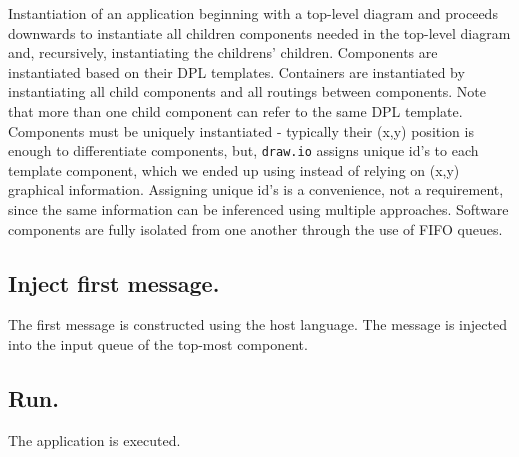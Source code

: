 \documentclass[10pt,anonymous,review]{acmart}
\begin{document}
  Instantiation\cite{run} of an application beginning with a top-level diagram
and proceeds downwards to instantiate all children components needed in
the top-level diagram and, recursively, instantiating the childrens'
children. Components are instantiated based on their DPL templates.
Containers are instantiated by instantiating all child components and
all routings between components. Note that more than one child component
can refer to the same DPL template. Components must be uniquely
instantiated - typically their (x,y) position is enough to differentiate
components, but, \texttt{draw.io} assigns unique
id's to each template component, which we ended up using instead of
relying on (x,y) graphical information. Assigning unique id's is a
convenience, not a requirement, since the same information can be inferenced 
using multiple approaches.
Software components are fully isolated from one another through the use
of FIFO queues.

\subsection{Inject first message.}

The first message is constructed using the host language. The message is
injected\cite{main} into the input queue of the top-most component.
%
  
\subsection{Run.}
The application is executed.
\end{document}

